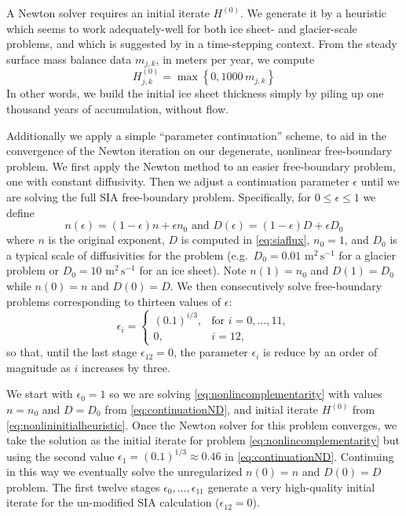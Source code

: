 \documentclass[twocolumn,letterpaper]{igs}
\newcommand\eps{\epsilon}
\begin{document}
A Newton solver requires an initial iterate $H^{(0)}$.  We generate it by a heuristic which seems to work adequately-well for both ice sheet- and glacier-scale problems, and which is suggested by \cite{JouvetGraeser2013} in a time-stepping context.  From the steady surface mass balance data $m_{j,k}$, in meters per year, we compute
\begin{equation}
H_{j,k}^{(0)} = \max\left\{0,1000\,m_{j,k}\right\}  \label{eq:nonlininitialheuristic}
\end{equation}
In other words, we build the initial ice sheet thickness simply by piling up one thousand years of accumulation, without flow.

Additionally we apply a simple ``parameter continuation'' scheme, to aid in the convergence of the Newton iteration on our degenerate, nonlinear free-boundary problem.  We first apply the Newton method to an easier free-boundary problem, one with constant diffusivity.  Then we adjust a continuation parameter $\eps$ until we are solving the full SIA free-boundary problem.  Specifically, for $0 \le \eps \le 1$ we define
\begin{equation}
n(\eps) = (1\!-\eps) n + \eps n_0 \text{ and } D(\eps) = (1\!-\eps) D + \eps D_0  \label{eq:continuationND}
\end{equation}
where $n$ is the original exponent, $D$ is computed in \eqref{eq:siaflux}, $n_0=1$, and $D_0$ is a typical scale of diffusivities for the problem (e.g.~$D_0=0.01$ $\text{m}^2\,\text{s}^{-1}$ for a glacier problem or $D_0=10$ $\text{m}^2\,\text{s}^{-1}$ for an ice sheet).  Note $n(1)=n_0$ and $D(1)=D_0$ while $n(0)=n$ and $D(0)=D$.  We then consecutively solve free-boundary problems corresponding to thirteen values of $\eps$:
\begin{equation}
\eps_i = \begin{cases}
           (0.1)^{i/3}, & \text{for } i=0,\dots,11, \\
           0, & i=12,
         \end{cases}  \label{eq:continuationseq}
\end{equation}
so that, until the last stage $\eps_{12}=0$, the parameter $\eps_i$ is reduce by an order of magnitude as $i$ increases by three.

We start with $\eps_0=1$ so we are solving \eqref{eq:nonlincomplementarity} with values $n=n_0$ and $D=D_0$ from \eqref{eq:continuationND}, and initial iterate $H^{(0)}$ from \eqref{eq:nonlininitialheuristic}.  Once the Newton solver for this problem converges, we take the solution as the initial iterate for problem \eqref{eq:nonlincomplementarity} but using the second value $\eps_1=(0.1)^{1/3}\approx 0.46$ in \eqref{eq:continuationND}.  Continuing in this way we eventually solve the unregularized $n(0)=n$ and $D(0)=D$ problem.  The first twelve stages $\eps_0,\dots,\eps_{11}$ generate a very high-quality initial iterate for the un-modified SIA calculation ($\eps_{12}=0$).
\end{document}

